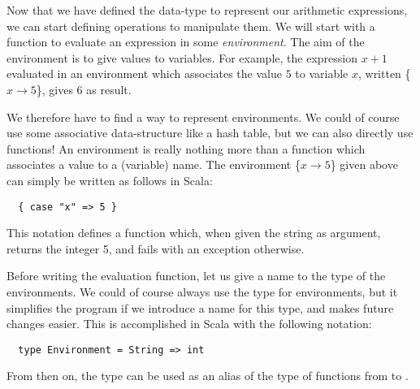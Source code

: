 \documentclass[a4paper,12pt,twoside,titlepage]{article}
\newcommand{\langname}[1]{#1\xspace}
\newcommand{\Scala}{\langname{Scala}}
\begin{document}
Now that we have defined the data-type to represent our arithmetic
expressions, we can start defining operations to manipulate them. We
will start with a function to evaluate an expression in some
\emph{environment}. The aim of the environment is to give values to
variables. For example, the expression $x+1$ evaluated in an
environment which associates the value $5$ to variable $x$, written
\{$x\rightarrow 5$\}, gives $6$ as result.

We therefore have to find a way to represent environments. We could of
course use some associative data-structure like a hash table, but we
can also directly use functions! An environment is really nothing more
than a function which associates a value to a (variable) name. The
environment \{$x\rightarrow 5$\} given above can simply be written as
follows in \Scala:
\begin{lstlisting}
  { case "x" => 5 }
\end{lstlisting}
This notation defines a function which, when given the string
 as argument, returns the integer 5, and fails with an
exception otherwise.

Before writing the evaluation function, let us give a name to the type
of the environments. We could of course always use the type
 for environments, but it simplifies the program
if we introduce a name for this type, and makes future changes easier.
This is accomplished in \Scala with the following notation:
\begin{lstlisting}
  type Environment = String => int
\end{lstlisting}
From then on, the type  can be used as an alias of
the type of functions from  to .
\end{document}
